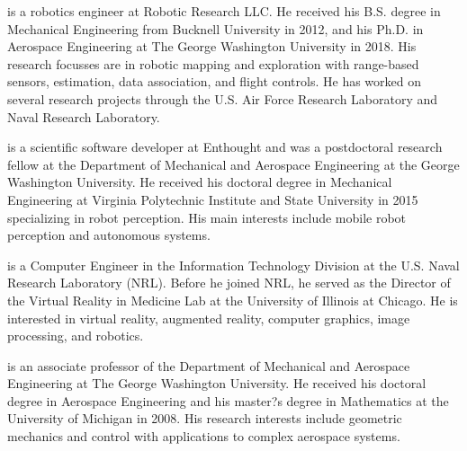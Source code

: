 \documentclass[smallextended]{svjour3}       %
\begin{document}
%
%
%




\vspace*{0.1\textwidth}

 is a robotics engineer at Robotic Research LLC. He received his B.S. degree in Mechanical Engineering from Bucknell University in 2012, and his Ph.D. in Aerospace Engineering at The George Washington University in 2018. His research focusses are in robotic mapping and exploration with range-based sensors, estimation, data association, and flight controls. He has worked on several research projects through the U.S. Air Force Research Laboratory and Naval Research Laboratory.

\vspace*{0.1\textwidth}

 is a scientific software developer at Enthought and was a postdoctoral research fellow at the Department of Mechanical and Aerospace Engineering at the George Washington University. He received his doctoral degree in Mechanical Engineering at Virginia Polytechnic Institute and State University in 2015 specializing in robot perception. His main interests include mobile robot perception and autonomous systems.


\vspace*{0.1\textwidth}

 is a Computer Engineer in the Information Technology Division at the U.S. Naval Research Laboratory (NRL). Before he joined NRL, he served as the Director of the Virtual Reality in Medicine Lab at the University of Illinois at Chicago. He is interested in virtual reality, augmented reality, computer graphics, image processing, and robotics.

\vspace*{0.1\textwidth}

 is an associate professor of the Department of Mechanical and Aerospace Engineering at The George Washington University. He received his doctoral degree in Aerospace Engineering and his master?s degree in Mathematics at the University of Michigan in 2008. His research interests include geometric mechanics and control with applications to complex aerospace systems.
\end{document}
